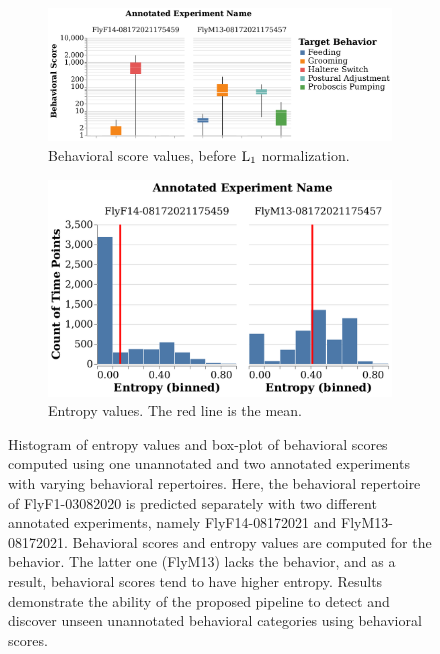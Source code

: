\begin{figure}[htb!]
	\centering
	\begin{subfigure}[b]{0.545\linewidth}
		\centering\includegraphics[width=\linewidth]{figures/BehavioralScores-RepertoireDifference.pdf}
		\caption{Behavioral score values, before $\textnormal{L}_1$ normalization. \label{figure:repertoire-score-comparison}}
	\end{subfigure}%
	\hfill
	\begin{subfigure}[b]{0.445\linewidth}
		\centering\includegraphics[width=\linewidth]{figures/Entropy-RepertoireDifference.pdf}
		\caption{Entropy values. The red line is the mean. \label{figure:repertoire-entropy-comparison}}
	\end{subfigure}%
	\caption[Histogram of entropy values and box-plot of the behavioral scores computed using one unannotated and two annotated experiments with varying behavioral repertoires.]{Histogram of entropy values and box-plot of behavioral scores computed using one unannotated and two annotated experiments with varying behavioral repertoires.
		Here, the behavioral repertoire of FlyF1-03082020 is predicted separately with two different annotated experiments, namely FlyF14-08172021 and FlyM13-08172021.
		Behavioral scores and entropy values are computed for the \HaltereSwitch behavior.
		The latter one (FlyM13) lacks the \HaltereSwitch behavior, and as a result, behavioral scores tend to have higher entropy.
		Results demonstrate the ability of the proposed pipeline to detect and discover unseen unannotated behavioral categories using behavioral scores.\label{figure:repertoire-difference}}
\end{figure}

